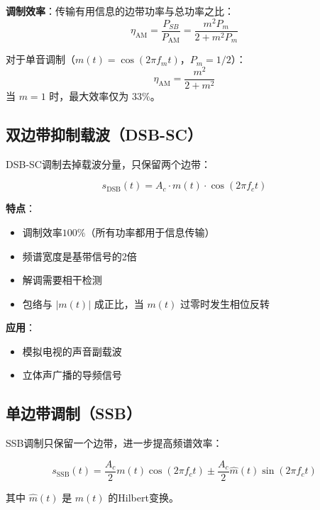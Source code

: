 \textbf{调制效率}：传输有用信息的边带功率与总功率之比：
\begin{equation}
    \eta_{\text{AM}} = \frac{P_{SB}}{P_{\text{AM}}} = \frac{m^2 P_m}{2 + m^2 P_m}
\end{equation}

对于单音调制（$m(t) = \cos(2\pi f_m t)$，$P_m = 1/2$）：
\begin{equation}
    \eta_{\text{AM}} = \frac{m^2}{2 + m^2}
\end{equation}
当 $m=1$ 时，最大效率仅为 $33\%$。

\subsection{双边带抑制载波（DSB-SC）}
\label{sec:dsb_sc}

DSB-SC调制去掉载波分量，只保留两个边带：

\begin{equation}
    s_{\text{DSB}}(t) = A_c \cdot m(t) \cdot \cos(2\pi f_c t)
\end{equation}

\textbf{特点}：
\begin{itemize}
    \item 调制效率$100\%$（所有功率都用于信息传输）
    \item 频谱宽度是基带信号的2倍
    \item 解调需要相干检测
    \item 包络与 $|m(t)|$ 成正比，当 $m(t)$ 过零时发生相位反转
\end{itemize}

\textbf{应用}：
\begin{itemize}
    \item 模拟电视的声音副载波
    \item 立体声广播的导频信号
\end{itemize}

\subsection{单边带调制（SSB）}
\label{sec:ssb_modulation}

SSB调制只保留一个边带，进一步提高频谱效率：

\begin{equation}
    s_{\text{SSB}}(t) = \frac{A_c}{2}m(t)\cos(2\pi f_c t) \pm \frac{A_c}{2}\hat{m}(t)\sin(2\pi f_c t)
\end{equation}

其中 $\hat{m}(t)$ 是 $m(t)$ 的Hilbert变换。

